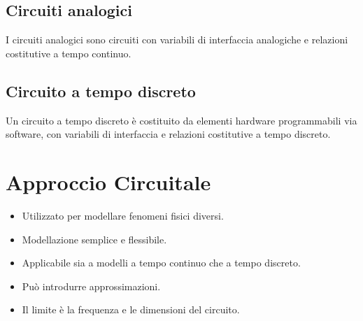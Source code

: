 \subsection*{Circuiti analogici}
I circuiti analogici sono circuiti con variabili di interfaccia analogiche e relazioni costitutive a tempo continuo.

\subsection*{Circuito a tempo discreto}
Un circuito a tempo discreto è costituito da elementi hardware programmabili via software, con variabili di interfaccia e relazioni costitutive a tempo discreto.

\section{Approccio Circuitale}
\begin{itemize}
    \item Utilizzato per modellare fenomeni fisici diversi.
    \item Modellazione semplice e flessibile.
    \item Applicabile sia a modelli a tempo continuo che a tempo discreto.
    \item Può introdurre approssimazioni.
    \item Il limite è la frequenza e le dimensioni del circuito.
\end{itemize}
